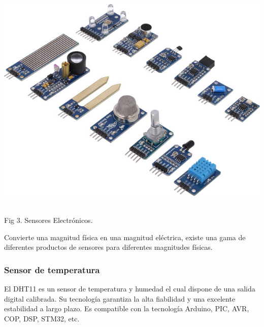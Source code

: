 \documentclass[12pt]{report}
\begin{document}
\begin{center}
\includegraphics[scale=0.33]{Documento/Figuras/fig4.jpg}
\begin{scriptsize}\\ 
Fig 3. Sensores Electrónicos.
\end{scriptsize}
\end{center}

Convierte una magnitud física en una magnitud eléctrica, existe una gama de diferentes productos de sensores para diferentes magnitudes físicas.

\subsubsection{Sensor de temperatura}
El DHT11 es un sensor de temperatura y humedad el cual dispone de una salida digital calibrada. Su tecnología garantiza la alta fiabilidad y una excelente estabilidad a largo plazo. Es compatible con la tecnología Arduino, PIC, AVR, COP, DSP, STM32, etc.
\end{document}
